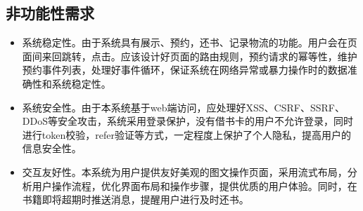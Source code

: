 \subsection{非功能性需求}
\begin{itemize}
    \item 系统稳定性。由于系统具有展示、预约，还书、记录物流的功能。用户会在页面间来回跳转，点击。应该设计好页面的路由规则，预约请求的幂等性，维护预约事件列表，处理好事件循环，保证系统在网络异常或暴力操作时的数据准确性和系统稳定性。
    \item 系统安全性。由于本系统基于web端访问，应处理好XSS、CSRF、SSRF、DDoS等安全攻击，系统采用登录保护，没有借书卡的用户不允许登录，同时进行token校验，refer验证等方式，一定程度上保护了个人隐私，提高用户的信息安全性。
    \item 交互友好性。本系统为用户提供友好美观的图文操作页面，采用流式布局，分析用户操作流程，优化界面布局和操作步骤，提供优质的用户体验。同时，在书籍即将超期时推送消息，提醒用户进行及时还书。
\end{itemize}
